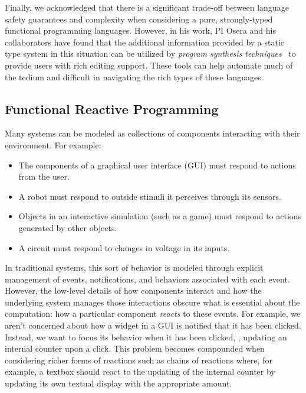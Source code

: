 Finally, we acknowledged that there is a significant trade-off between language safety guarantees and complexity when considering a pure, strongly-typed functional programming languages.
However, in his work, PI Osera and his collaborators have found that the additional information provided by a static type system in this situation can be utilized by \emph{program synthesis techniques}~\cite{osera:thesis:2015} to provide users with rich editing support.
These tools can help automate much of the tedium and difficult in navigating the rich types of these languages.

\subsection{Functional Reactive Programming}

Many systems can be modeled as collections of components interacting with their environment.
For example:
\begin{itemize}[itemsep=0pt]
  \item The components of a graphical user interface (GUI) must respond to actions from the user.
  \item A robot must respond to outside stimuli it perceives through its sensors.
  \item Objects in an interactive simulation (such as a game) must respond to actions generated by other objects.
  \item A circuit must respond to changes in voltage in its inputs.
\end{itemize}
In traditional systems, this sort of behavior is modeled through explicit management of events, notifications, and behaviors associated with each event.
However, the low-level details of how components interact and how the underlying system manages those interactions obscure what is essential about the computation: how a particular component \emph{reacts} to these events.
For example, we aren't concerned about how a widget in a GUI is notified that it has been clicked.
Instead, we want to focus its behavior when it has been clicked, \eg, updating an internal counter upon a click.
This problem becomes compounded when considering richer forms of reactions such as chains of reactions where, for example, a textbox should react to the updating of the internal counter by updating its own textual display with the appropriate amount.

